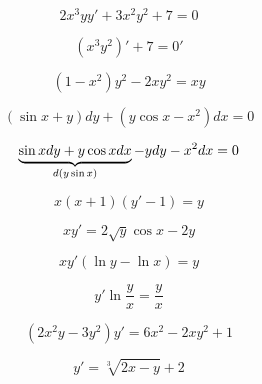 \documentclass[12pt, fleqn]{article}
\begin{document}
    \begin{Example}[320]
      \[2x^3 y y' + 3x^2 y^2 + 7 = 0\]
    \end{Example}

    \begin{Proof}
      \[(x^3 y^2)' + 7 = 0'\]
    \end{Proof}

    \begin{Example}[330]
      \[(1-x^2)y^2 - 2xy^2 = xy\]
    \end{Example}

    \begin{Proof}

    \end{Proof}

    \begin{Example}[333]
      \[(\sin x + y) dy + (y \cos x - x^2) dx = 0\]
    \end{Example}

    \begin{Proof}
      \[\ub{d(y \sin x)}{\sin x dy + y \cos x dx} - y dy - x^2 dx = 0\]
    \end{Proof}

    \begin{Example}[338]
      \[x(x+1)(y'-1) = y\]
    \end{Example}

    \begin{Example}[349]
      \[xy' = 2 \sqrt y \cos x - 2y\]
    \end{Example}

    \begin{Proof}

    \end{Proof}

    \begin{Example}[359]
      \[xy'(\ln y - \ln x) = y\]
    \end{Example}

    \begin{Proof}[однородное]
      \[y' \ln \dfrac{y}{x} = \dfrac{y}{x}\]
    \end{Proof}

    \begin{Example}[361]
      \[(2x^2 y - 3y^2)y' = 6x^2 - 2xy^2 +1\]
    \end{Example}

    \begin{Example}[368]
      \[y' = \sqrt[3]{2x - y} + 2\]
    \end{Example}
\end{document}
